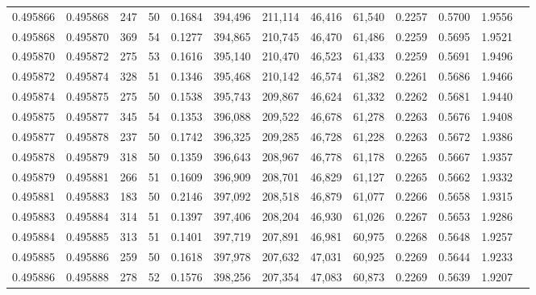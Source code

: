 \begin{tabular}{rrrrrrrrrrrrr}
0.495866 & 0.495868 &   247 &  50 &                                     0.1684 & 394,496 & 211,114 &  46,416 &  61,540 & 0.2257 & 0.5700 & 1.9556 \\
0.495868 & 0.495870 &   369 &  54 &                                     0.1277 & 394,865 & 210,745 &  46,470 &  61,486 & 0.2259 & 0.5695 & 1.9521 \\
0.495870 & 0.495872 &   275 &  53 &                                     0.1616 & 395,140 & 210,470 &  46,523 &  61,433 & 0.2259 & 0.5691 & 1.9496 \\
0.495872 & 0.495874 &   328 &  51 &                                     0.1346 & 395,468 & 210,142 &  46,574 &  61,382 & 0.2261 & 0.5686 & 1.9466 \\
0.495874 & 0.495875 &   275 &  50 &                                     0.1538 & 395,743 & 209,867 &  46,624 &  61,332 & 0.2262 & 0.5681 & 1.9440 \\
0.495875 & 0.495877 &   345 &  54 &                                     0.1353 & 396,088 & 209,522 &  46,678 &  61,278 & 0.2263 & 0.5676 & 1.9408 \\
0.495877 & 0.495878 &   237 &  50 &                                     0.1742 & 396,325 & 209,285 &  46,728 &  61,228 & 0.2263 & 0.5672 & 1.9386 \\
0.495878 & 0.495879 &   318 &  50 &                                     0.1359 & 396,643 & 208,967 &  46,778 &  61,178 & 0.2265 & 0.5667 & 1.9357 \\
0.495879 & 0.495881 &   266 &  51 &                                     0.1609 & 396,909 & 208,701 &  46,829 &  61,127 & 0.2265 & 0.5662 & 1.9332 \\
0.495881 & 0.495883 &   183 &  50 &                                     0.2146 & 397,092 & 208,518 &  46,879 &  61,077 & 0.2266 & 0.5658 & 1.9315 \\
0.495883 & 0.495884 &   314 &  51 &                                     0.1397 & 397,406 & 208,204 &  46,930 &  61,026 & 0.2267 & 0.5653 & 1.9286 \\
0.495884 & 0.495885 &   313 &  51 &                                     0.1401 & 397,719 & 207,891 &  46,981 &  60,975 & 0.2268 & 0.5648 & 1.9257 \\
0.495885 & 0.495886 &   259 &  50 &                                     0.1618 & 397,978 & 207,632 &  47,031 &  60,925 & 0.2269 & 0.5644 & 1.9233 \\
0.495886 & 0.495888 &   278 &  52 &                                     0.1576 & 398,256 & 207,354 &  47,083 &  60,873 & 0.2269 & 0.5639 & 1.9207 \\

\end{tabular}
